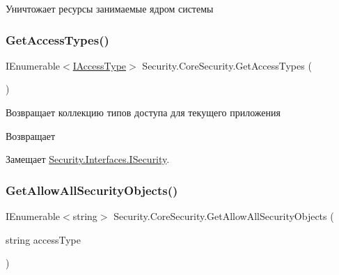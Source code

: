 Уничтожает ресурсы занимаемые ядром системы 

\mbox{\label{class_security_1_1_core_security_a874a60fc9733766b2530c295a7009aed}} 
\subsubsection{\texorpdfstring{Get\+Access\+Types()}{GetAccessTypes()}}
{\footnotesize\ttfamily I\+Enumerable$<$\hyperlink{interface_security_1_1_interfaces_1_1_model_1_1_i_access_type}{I\+Access\+Type}$>$ Security.\+Core\+Security.\+Get\+Access\+Types (\begin{DoxyParamCaption}{ }\end{DoxyParamCaption})}



Возвращает коллекцию типов доступа для текущего приложения 

\begin{DoxyReturn}{Возвращает}

\end{DoxyReturn}


Замещает \hyperlink{interface_security_1_1_interfaces_1_1_i_security_a5057c425b04d1c75e8ca9c7b451a1ecf}{Security.\+Interfaces.\+I\+Security}.

\mbox{\label{class_security_1_1_core_security_acf070051371bf58f0f4b082e5f6b7352}} 
\subsubsection{\texorpdfstring{Get\+Allow\+All\+Security\+Objects()}{GetAllowAllSecurityObjects()}}
{\footnotesize\ttfamily I\+Enumerable$<$string$>$ Security.\+Core\+Security.\+Get\+Allow\+All\+Security\+Objects (\begin{DoxyParamCaption}\item[{string}]{access\+Type }\end{DoxyParamCaption})}



